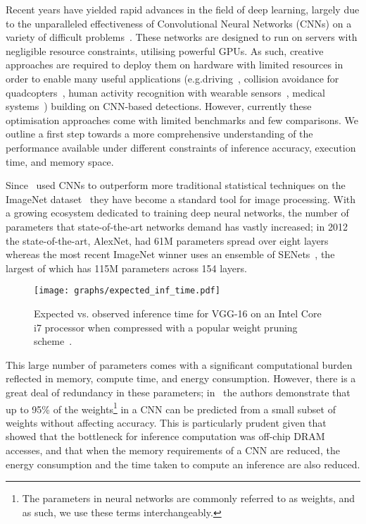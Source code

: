 \documentclass[conference]{IEEEtran}
\begin{document}
Recent years have yielded rapid advances in the field of deep learning, largely due to the unparalleled effectiveness of Convolutional Neural Networks (CNNs) on a variety of difficult problems~\cite{lecun2015deep}. These networks are designed to run on servers with 
negligible resource constraints, 
utilising powerful GPUs. As such, creative approaches are required to deploy them on hardware with limited resources in order to enable many useful applications (e.g.\autonomous driving~\cite{bojarski16,teichmann16}, collision avoidance for quadcopters~\cite{alvarez16}, human activity recognition with wearable sensors~\cite{radu18}, medical systems~\cite{doherty13}) building on CNN-based detections. However, currently these optimisation approaches come with limited benchmarks and few comparisons. We outline a first step towards a more comprehensive understanding of the performance available under different constraints of inference accuracy, execution time, and memory space.

Since~\cite{krizhevsky2012imagenet} used CNNs to outperform more traditional statistical techniques on the ImageNet dataset~\cite{ILSVRC15} they have become a standard tool for image processing. With a growing ecosystem dedicated to training deep neural networks, the number of parameters that state-of-the-art networks demand has vastly increased; in 2012 the state-of-the-art, AlexNet, had 61M parameters spread over eight layers whereas the most recent ImageNet winner uses an ensemble of SENets~\cite{SEnet}, the largest of which has 115M parameters across 154 layers.

\begin{figure}[t]
\texttt{[image: graphs/expected\_inf\_time.pdf]}
\vspace{-0.5cm}
\caption{Expected vs. observed inference time for VGG-16 on an Intel Core i7 processor when compressed with a popular weight pruning scheme~\cite{han2015learning}.}

\label{fig:expected-inf-time}
\vspace{-0.3cm}
\end{figure}
This large number of parameters comes with a significant computational burden reflected in memory, compute time, and energy consumption. However, there is a great deal of redundancy in these parameters; in~\cite{denil2013predicting} the authors demonstrate that up to 95\% of the weights\footnote{The parameters in neural networks are commonly referred to as weights, and as such, we use these terms interchangeably.} in a CNN can be predicted from a small subset of weights without affecting accuracy. This is particularly prudent given that~\cite{han2015deep} showed that the bottleneck for inference computation was off-chip DRAM accesses, and that when the memory requirements of a CNN are reduced, the energy consumption and the time taken to compute an inference are also reduced. 
\end{document}
